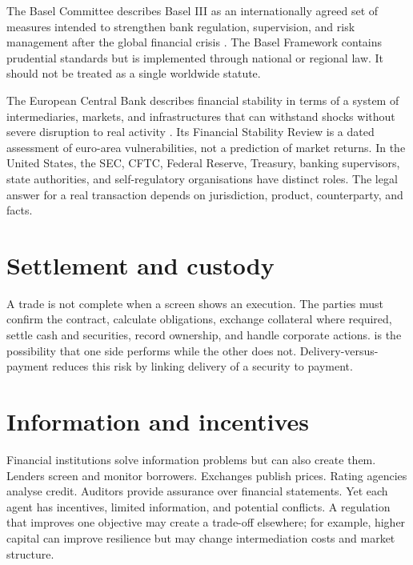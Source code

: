 The Basel Committee describes Basel III as an internationally agreed set of measures intended to strengthen bank regulation, supervision, and risk management after the global financial crisis \cite{basel3}. The Basel Framework contains prudential standards but is implemented through national or regional law. It should not be treated as a single worldwide statute.

The European Central Bank describes financial stability in terms of a system of intermediaries, markets, and infrastructures that can withstand shocks without severe disruption to real activity \cite{ecb2026}. Its Financial Stability Review is a dated assessment of euro-area vulnerabilities, not a prediction of market returns. In the United States, the SEC, CFTC, Federal Reserve, Treasury, banking supervisors, state authorities, and self-regulatory organisations have distinct roles. The legal answer for a real transaction depends on jurisdiction, product, counterparty, and facts.

\section{Settlement and custody}
A trade is not complete when a screen shows an execution. The parties must confirm the contract, calculate obligations, exchange collateral where required, settle cash and securities, record ownership, and handle corporate actions.  is the possibility that one side performs while the other does not. Delivery-versus-payment reduces this risk by linking delivery of a security to payment.

\section{Information and incentives}
Financial institutions solve information problems but can also create them. Lenders screen and monitor borrowers. Exchanges publish prices. Rating agencies analyse credit. Auditors provide assurance over financial statements. Yet each agent has incentives, limited information, and potential conflicts. A regulation that improves one objective may create a trade-off elsewhere; for example, higher capital can improve resilience but may change intermediation costs and market structure.


